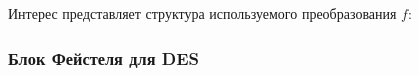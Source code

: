 Интерес представляет структура используемого преобразования $f$:


\begin{frame}
    \frametitle{Блок Фейстеля для DES}

    \begin{figure}
        \begin{center}

\end{center}
\end{figure}
\end{frame}
